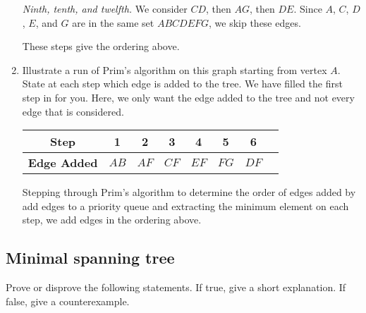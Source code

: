 \begin{enumerate}
\begin{solution}
\textit{Ninth, tenth, and twelfth. }We consider $CD$, then $AG$, then $DE$. Since $A$, $C$, $D$, $E$, and $G$ are in the same set $ABCDEFG$, we skip these edges.

These steps give the ordering above.
\end{solution}
\item Illustrate a run of Prim's algorithm on this graph starting from vertex $A$. State at each step which edge is added to the tree. We have filled the first step in for you. Here, we only want the edge added to the tree and not every edge that is considered. 

\begin{center}
\begin{tabular}{c|c|c|c|c|c|c|c}
     \textbf{Step} & 1 & 2 & 3 & 4 & 5 & 6\\
     \hline
     \textbf{Edge Added} & $AB$ & $AF$ & $CF$ & $EF$ & $FG$ & $DF$\\
\end{tabular}
\end{center}
\begin{solution}
Stepping through Prim's algorithm to determine the order of edges added by add edges to a priority queue and extracting the minimum element on each step, we add edges in the ordering above.
\end{solution}
\end{enumerate}
\newpage
\subsection{Minimal spanning tree}
Prove or disprove the following statements. If true, give a short explanation. If false, give a counterexample.

